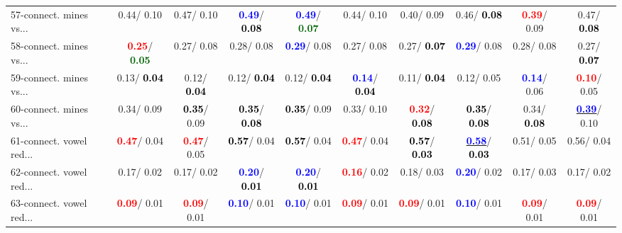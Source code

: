 \begin{table}[h]
\begin{center}
{\begin{tabular}{lc|c|c|c|c|c|c|c|c}
57-connect. mines vs... &   0.44/  0.10 &   0.47/  0.10 & \textcolor{blue}{\textbf{  0.49}}/\textcolor{black}{\textbf{  0.08}} & \textcolor{blue}{\textbf{  0.49}}/\textcolor{darkgreen}{\textbf{  0.07}} &   0.44/  0.10 &   0.40/  0.09 &   0.46/\textcolor{black}{\textbf{  0.08}} & \textcolor{red}{\textbf{  0.39}}/  0.09 &   0.47/\textcolor{black}{\textbf{  0.08}} \\
58-connect. mines vs... & \textcolor{red}{\textbf{  0.25}}/\textcolor{darkgreen}{\textbf{  0.05}} &   0.27/  0.08 &   0.28/  0.08 & \textcolor{blue}{\textbf{  0.29}}/  0.08 &   0.27/  0.08 &   0.27/\textcolor{black}{\textbf{  0.07}} & \textcolor{blue}{\textbf{  0.29}}/  0.08 &   0.28/  0.08 &   0.27/\textcolor{black}{\textbf{  0.07}} \\
59-connect. mines vs... &   0.13/\textcolor{black}{\textbf{  0.04}} &   0.12/\textcolor{black}{\textbf{  0.04}} &   0.12/\textcolor{black}{\textbf{  0.04}} &   0.12/\textcolor{black}{\textbf{  0.04}} & \textcolor{blue}{\textbf{  0.14}}/\textcolor{black}{\textbf{  0.04}} &   0.11/\textcolor{black}{\textbf{  0.04}} &   0.12/  0.05 & \textcolor{blue}{\textbf{  0.14}}/  0.06 & \textcolor{red}{\textbf{  0.10}}/  0.05 \\
60-connect. mines vs... &   0.34/  0.09 & \textcolor{black}{\textbf{  0.35}}/  0.09 & \textcolor{black}{\textbf{  0.35}}/\textcolor{black}{\textbf{  0.08}} & \textcolor{black}{\textbf{  0.35}}/  0.09 &   0.33/  0.10 & \textcolor{red}{\textbf{  0.32}}/\textcolor{black}{\textbf{  0.08}} & \textcolor{black}{\textbf{  0.35}}/\textcolor{black}{\textbf{  0.08}} &   0.34/\textcolor{black}{\textbf{  0.08}} & \underline{\textcolor{blue}{\textbf{  0.39}}}/  0.10 \\ \hline
61-connect. vowel red... & \textcolor{red}{\textbf{  0.47}}/  0.04 & \textcolor{red}{\textbf{  0.47}}/  0.05 & \textcolor{black}{\textbf{  0.57}}/  0.04 & \textcolor{black}{\textbf{  0.57}}/  0.04 & \textcolor{red}{\textbf{  0.47}}/  0.04 & \textcolor{black}{\textbf{  0.57}}/\textcolor{black}{\textbf{  0.03}} & \underline{\textcolor{blue}{\textbf{  0.58}}}/\textcolor{black}{\textbf{  0.03}} &   0.51/  0.05 &   0.56/  0.04 \\
62-connect. vowel red... &   0.17/  0.02 &   0.17/  0.02 & \textcolor{blue}{\textbf{  0.20}}/\textcolor{black}{\textbf{  0.01}} & \textcolor{blue}{\textbf{  0.20}}/\textcolor{black}{\textbf{  0.01}} & \textcolor{red}{\textbf{  0.16}}/  0.02 &   0.18/  0.03 & \textcolor{blue}{\textbf{  0.20}}/  0.02 &   0.17/  0.03 &   0.17/  0.02 \\
63-connect. vowel red... & \textcolor{red}{\textbf{  0.09}}/  0.01 & \textcolor{red}{\textbf{  0.09}}/  0.01 & \textcolor{blue}{\textbf{  0.10}}/  0.01 & \textcolor{blue}{\textbf{  0.10}}/  0.01 & \textcolor{red}{\textbf{  0.09}}/  0.01 & \textcolor{red}{\textbf{  0.09}}/  0.01 & \textcolor{blue}{\textbf{  0.10}}/  0.01 & \textcolor{red}{\textbf{  0.09}}/  0.01 & \textcolor{red}{\textbf{  0.09}}/  0.01 \\

\end{tabular}}
\end{center}
\end{table}
